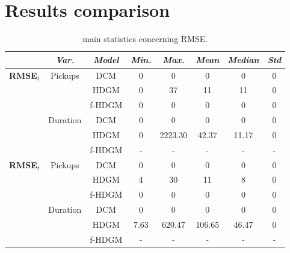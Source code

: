 \section{Results comparison}
\begin{table}[h!]
	\centering
	\renewcommand\arraystretch{1.3}
	\begin{tabular}{c|c|c|c|c|c|c|c}
		\hline
		\textit{} & \textit{Var.} & \textit{Model} & \textit{Min.} & \textit{Max.} & \textit{Mean} & \textit{Median} & \textit{Std}\\
		\hline
		\multirow{6}{4em}{\textbf{RMSE$_t$}} & \multirow{3}{4em}{Pickups} & DCM & \num{0} & \num{0} & \num{0} & \num{0} & \num{0} \\ \cline{3-8}
		& & HDGM & \num{0} & \num{37} & \num{11} & \num{11} & \num{0} \\ \cline{3-8}
		& & f-HDGM & \num{0} & \num{0} & \num{0} & \num{0} & \num{0} \\ \cline{2-8}
		& \multirow{3}{4em}{Duration} & DCM & \num{0} & \num{0} & \num{0} & \num{0} & \num{0} \\ \cline{3-8} 
		& & HDGM & \num{0} & \num{2223.30} & \num{42.37} & \num{11.17} & \num{0} \\ \cline{3-8}
		& & f-HDGM & - & - & - & - & - \\
		\hline
		\multirow{6}{4em}{\textbf{RMSE$_t$}} & \multirow{3}{4em}{Pickups} & DCM & \num{0} & \num{0} & \num{0} & \num{0} & \num{0} \\ \cline{3-8}
		& & HDGM & \num{4} & \num{30} & \num{11} & \num{8} & \num{0} \\ \cline{3-8}
		& & f-HDGM & \num{0} & \num{0} & \num{0} & \num{0} & \num{0} \\ \cline{2-8}
		& \multirow{3}{4em}{Duration} & DCM & \num{0} & \num{0} & \num{0} & \num{0} & \num{0} \\ \cline{3-8} 
		& & HDGM & \num{7.63} & \num{620.47} & \num{106.65} & \num{46.47} & \num{0} \\ \cline{3-8}
		& & f-HDGM & - & - & - & - & - \\
		\hline
	\end{tabular}
	\caption[Main statistics concerning RMSE (HDGM)]{main statistics concerning RMSE.}
	\label{RMSE_HDGM_stats}
\end{table}